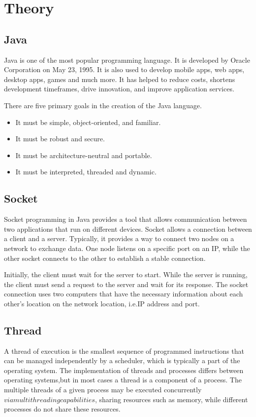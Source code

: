 \chapter{Theory}\label{ch:theory}


\section{Java}\label{sec:java}
Java is one of the most popular programming language.
It is developed by Oracle Corporation on May 23, 1995.
It is also used to develop mobile apps, web apps, desktop apps, games and much more.
It has helped to reduce costs, shortens development timeframes, drive innovation,
and improve application services.
\medskip

\noindent
There are five primary goals in the creation of the Java language.
\begin{itemize}
    \item It must be simple, object-oriented, and familiar.
    \item It must be robust and secure.
    \item It must be architecture-neutral and portable.
    \item It must be interpreted, threaded and dynamic.
\end{itemize}


\section{Socket}\label{sec:socket}
Socket programming in Java provides a tool that allows communication between two applications
that run on different devices.
Socket allows a connection between a client and a server.
Typically, it provides a way to connect two nodes on a network to exchange data.
One node listens on a specific port on an IP, while the other socket connects to the other to
establish a stable connection.
\medskip

\noindent
Initially, the client must wait for the server to start.
While the server is running, the client must send a request to the server and wait for its
response.
The socket connection uses two computers that have the necessary information about each
other's location on the network location, i.e.IP address and port.


\section{Thread}\label{sec:thread}
A thread of execution is the smallest sequence of programmed instructions that can be managed
independently by a scheduler, which is typically a part of the operating system.
The implementation of threads and processes differs between operating systems,but in most cases
a thread is a component of a process.
The multiple threads of a given process may be executed concurrently
\(via multithreading capabilities\), sharing resources such as memory, while different
processes do not share these resources.
\medskip

